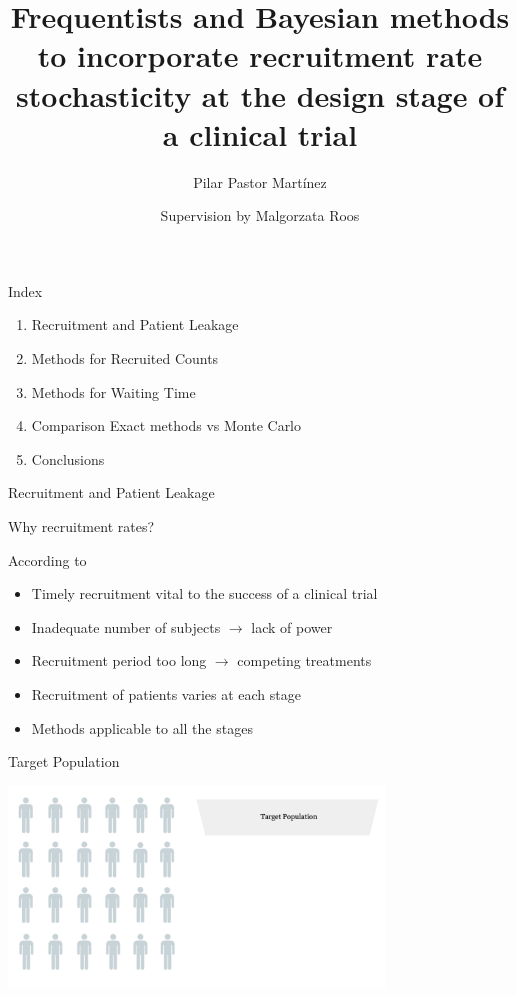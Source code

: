 \documentclass[english]{beamer}\usepackage[]{graphicx}\usepackage[]{xcolor}
\title[Recruitment rate stochasticity
at the design stage of a clinical trial]{Frequentists and Bayesian methods to incorporate
recruitment rate stochasticity
at the design stage of a clinical trial}
\author{Supervision by Malgorzata Roos}
\subtitle{Pilar Pastor Martínez}
\begin{document}
\maketitle

\begin{frame}{Index}

\begin{enumerate}
\item Recruitment and Patient Leakage
\item Methods for Recruited Counts
\item Methods for Waiting Time
\item Comparison Exact methods vs Monte Carlo
\item Conclusions
\end{enumerate}

\end{frame}

\begin{frame}{Recruitment and Patient Leakage}

\end{frame}

\begin{frame}{Why recruitment rates?}

According to \cite{carter2004application}
\begin{itemize}
\item Timely recruitment vital to the success of a clinical trial
\item Inadequate number of subjects $\rightarrow$ lack of power
\item Recruitment period too long $\rightarrow$ competing treatments
\item Recruitment of patients varies at each stage 
\item Methods applicable to all the stages
\end{itemize}


\end{frame}


\begin{frame}{Target Population}

\includegraphics[width=100mm,scale=1]{targetpop.png}

\end{frame}
\end{document}

